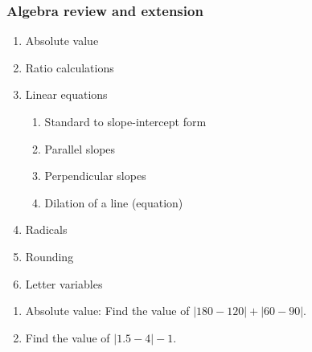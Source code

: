 \documentclass[12pt, oneside]{article}
\begin{document}
\subsubsection*{Algebra review and extension}
  \begin{enumerate}
  \item Absolute value
  \item Ratio calculations
  \item Linear equations
  \begin{enumerate}
    \item Standard to slope-intercept form
    \item Parallel slopes
    \item Perpendicular slopes
    \item Dilation of a line (equation)
    \end{enumerate}
  \item Radicals
  \item Rounding
  \item Letter variables
  \end{enumerate}

  \begin{enumerate}
    \subsubsection*{Absolute value}
    \item Absolute value: Find the value of $|180-120|+|60-90|$. %
    \item Find the value of $|1.5-4|-1$.


  \end{enumerate}
\end{document}
